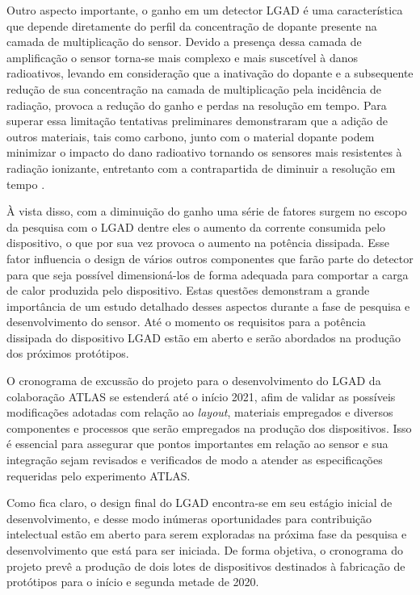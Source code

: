 Outro aspecto importante, o ganho em um detector LGAD é uma característica que depende diretamente do perfil da concentração de dopante presente na camada de multiplicação do sensor. Devido a presença dessa camada de amplificação o sensor torna-se mais complexo e mais suscetível à danos radioativos, levando em consideração que a inativação do dopante e a subsequente redução de sua concentração na camada de multiplicação pela incidência de radiação, provoca a redução do ganho e perdas na resolução em tempo. Para superar essa limitação tentativas preliminares demonstraram que a adição de outros materiais, tais como carbono, junto com o material dopante podem minimizar o impacto do dano radioativo tornando os sensores mais resistentes à radiação ionizante, entretanto com a contrapartida de diminuir a resolução em tempo \cite{tdr}. 

À vista disso, com a diminuição do ganho uma série de fatores surgem no escopo da pesquisa com o LGAD dentre eles o aumento da corrente consumida pelo dispositivo, o que por sua vez provoca o aumento na potência dissipada. Esse fator influencia o design de vários outros componentes que farão parte do detector para que seja possível dimensioná-los de forma adequada para comportar a carga de calor produzida pelo dispositivo. Estas questões  demonstram a grande importância de um estudo detalhado desses aspectos durante a fase de pesquisa e desenvolvimento do sensor. Até o momento os requisitos para a potência dissipada do dispositivo LGAD estão em aberto e serão abordados na produção dos próximos protótipos.

O cronograma de excussão do projeto para o desenvolvimento do LGAD da colaboração ATLAS se estenderá até o início 2021, afim de validar as possíveis modificações adotadas com relação ao {\it layout}, materiais empregados e diversos componentes e processos que serão empregados na produção dos dispositivos. Isso é essencial para assegurar que pontos importantes em relação ao sensor e sua integração sejam revisados e verificados de modo a atender as especificações requeridas pelo experimento ATLAS.

Como fica claro, o design final do LGAD encontra-se em seu estágio inicial de desenvolvimento, e desse modo inúmeras oportunidades para contribuição intelectual estão em aberto para serem exploradas na próxima fase da pesquisa e desenvolvimento que está para ser iniciada. De forma objetiva, o cronograma do projeto prevê a produção de dois lotes de dispositivos destinados à fabricação de protótipos para o início e segunda metade de 2020.%


